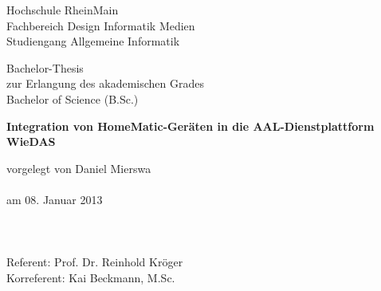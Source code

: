 
\begin{titlepage}
  \textwidth170mm
  \enlargethispage{3cm}
  \setlength{\parindent}{0em}
\begin{minipage}{\textwidth}
    \centering
    \vspace{0.8cm}
    \begin{large}Hochschule RheinMain\\
    Fachbereich Design Informatik Medien\\
    Studiengang Allgemeine Informatik\end{large}
\end{minipage}
\begin{minipage}{\textwidth}
    \centering
    \vspace{0.8cm}
   \begin{large} 
Bachelor-Thesis\\
    zur Erlangung des akademischen Grades\\
    Bachelor of Science (B.Sc.)
\end{large}
    
    
    \vspace{4cm}

    \renewcommand{\baselinestretch}{1.8}
    \small\normalsize
    {\LARGE \bf Integration von HomeMatic-Geräten in die AAL-Dienstplattform WieDAS}\\

    \renewcommand{\baselinestretch}{1}
    \small\normalsize

  \end{minipage}

  \vspace{6.5cm}
  vorgelegt von Daniel Mierswa\\
  \\
  am 08. Januar 2013\\
  \\
  \\
  \\
	Referent: Prof. Dr. Reinhold Kröger\\
	Korreferent: Kai Beckmann, M.Sc.
  \clearpage
\end{titlepage}
